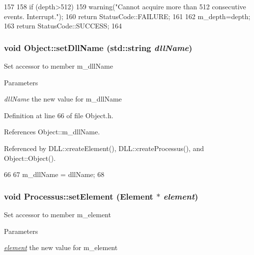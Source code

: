 \begin{DoxyCode}
157                                                                {
158   if (depth>512){
159     warning("Cannot acquire more than 512 consecutive events. Interrupt.");
160     return StatusCode::FAILURE;
161   }
162   m_depth=depth;
163   return StatusCode::SUCCESS;
164 }
\end{DoxyCode}
\hypertarget{classObject_a870c5af919958c2136623b2d7816d123}{
\subsubsection[{setDllName}]{\setlength{\rightskip}{0pt plus 5cm}void Object::setDllName (std::string {\em dllName})}}
\label{classObject_a870c5af919958c2136623b2d7816d123}
Set accessor to member m\_\-dllName 
\begin{DoxyParams}{Parameters}
\item[{\em dllName}]the new value for m\_\-dllName \end{DoxyParams}


Definition at line 66 of file Object.h.

References Object::m\_\-dllName.

Referenced by DLL::createElement(), DLL::createProcessus(), and Object::Object().


\begin{DoxyCode}
66                                       {
67     m_dllName = dllName;
68   }
\end{DoxyCode}
\hypertarget{classProcessus_a8ddef94227d83d9dae2cd49aebc33353}{
\subsubsection[{setElement}]{\setlength{\rightskip}{0pt plus 5cm}void Processus::setElement ({\bf Element} $\ast$ {\em element})}}
\label{classProcessus_a8ddef94227d83d9dae2cd49aebc33353}
Set accessor to member m\_\-element 
\begin{DoxyParams}{Parameters}
\item[{\em \hyperlink{namespaceelement}{element}}]the new value for m\_\-element \end{DoxyParams}


